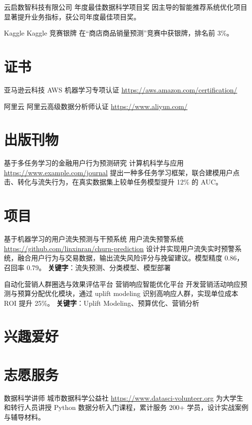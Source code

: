\documentclass[a4paper, serif, 10pt]{moderncv}
\begin{document}
        {云启数智科技有限公司}
        {年度最佳数据科学项目奖}
        {}
        {}
        {因主导的智能推荐系统优化项目显著提升业务指标，获公司年度最佳项目奖。}

        {Kaggle}
        {Kaggle 竞赛银牌}
        {}
        {}
        {在“商店商品销量预测”竞赛中获银牌，排名前 3\%。}
\section{证书}

        {亚马逊云科技}
        {AWS 机器学习专项认证}
        {\url{https://aws.amazon.com/certification/}}
        {}
        {}

        {阿里云}
        {阿里云高级数据分析师认证}
        {\url{https://www.aliyun.com/}}
        {}
        {}
\section{出版刊物}

        {基于多任务学习的金融用户行为预测研究}
        {计算机科学与应用}
        {\url{https://www.example.com/journal}}
        {}
        {提出一种多任务学习框架，联合建模用户点击、转化与流失行为，在真实数据集上较单任务模型提升 12\% 的 AUC。}
\section{项目}

        {基于机器学习的用户流失预测与干预系统}
        {用户流失预警系统}
        {\url{https://github.com/linxinran/churn-prediction}}
        {}
        {设计并实现用户流失实时预警系统，融合用户行为与交易数据，输出流失风险评分与挽留建议。模型精度 0.86，召回率 0.79。
\textbf{关键字}：流失预测、分类模型、模型部署}

        {自动化营销人群圈选与效果评估平台}
        {营销响应智能优化平台}
        {}
        {}
        {开发营销活动响应预测与预算分配优化模块，通过 uplift modeling 识别高响应人群，实现单位成本 ROI 提升 25\%。
\textbf{关键字}：Uplift Modeling、预算优化、营销分析}
\section{兴趣爱好}

\section{志愿服务}

        {数据科学讲师}
        {城市数据科学公益社}
        {\url{https://www.datasci-volunteer.org}}
        {}
        {为大学生和转行人员讲授 Python 数据分析入门课程，累计服务 200+ 学员，设计实战案例与辅导材料。}
\end{document}
